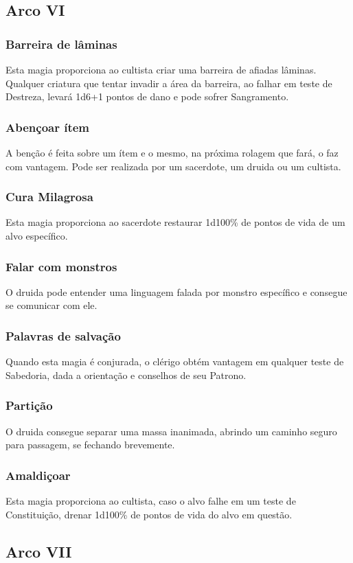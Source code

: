 \documentclass[10pt,twoside,twocolumn]{book}
\begin{document}
\subsection*{Arco VI}
\subsubsection*{Barreira de lâminas}
Esta magia proporciona ao cultista criar uma barreira de afiadas lâminas. Qualquer criatura que tentar invadir a área da barreira, ao falhar em teste de Destreza, levará 1d6+1 pontos de dano e pode sofrer Sangramento.
\subsubsection*{Abençoar ítem}
A benção é feita sobre um ítem e o mesmo, na próxima rolagem que fará, o faz com vantagem. Pode ser realizada por um sacerdote, um druida ou um cultista.
\subsubsection*{Cura Milagrosa}
Esta magia proporciona ao sacerdote restaurar 1d100\% de pontos de vida de um alvo específico.
\subsubsection*{Falar com monstros}
O druida pode entender uma linguagem falada por monstro específico e consegue se comunicar com ele. 
\subsubsection*{Palavras de salvação}
Quando esta magia é conjurada, o clérigo obtém vantagem em qualquer teste de Sabedoria, dada a orientação e conselhos de seu Patrono.
\subsubsection*{Partição}
O druida consegue separar uma massa inanimada, abrindo um caminho seguro para passagem, se fechando brevemente.
\subsubsection*{Amaldiçoar}
Esta magia proporciona ao cultista, caso o alvo falhe em um teste de Constituição, drenar 1d100\% de pontos de vida do alvo em questão.

\subsection*{Arco VII}
\end{document}
